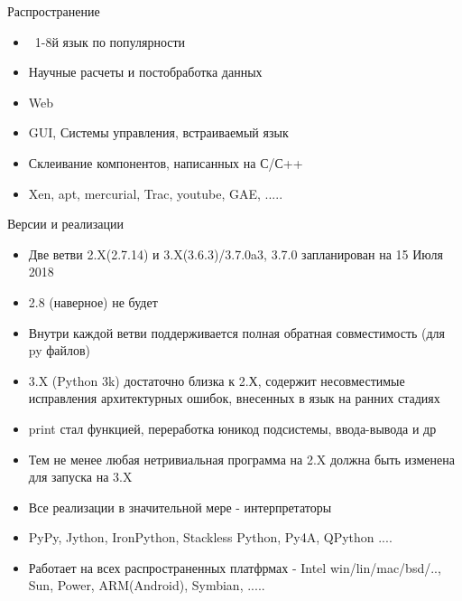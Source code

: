 \documentclass{article}
\begin{document}
\begin{center} Распространение \end{center}
\begin{itemize}
    \item ~1-8й язык по популярности
    \item Научные расчеты и постобработка данных
    \item Web
    \item GUI, Системы управления, встраиваемый язык
    \item Склеивание компонентов, написанных на С/С++
    \item Xen, apt, mercurial, Trac, youtube, GAE, .....
\end{itemize}
\newpage

\begin{center} Версии и реализации \end{center}
\begin{itemize}
    \item Две ветви 2.X(2.7.14) и 3.X(3.6.3)/3.7.0a3, 3.7.0 запланирован на 15 Июля 2018
    \item 2.8 (наверное) не будет
    \item Внутри каждой ветви поддерживается полная обратная совместимость (для py файлов)
    \item 3.X (Python 3k) достаточно близка к 2.Х, содержит несовместимые исправления 
    		архитектурных ошибок, внесенных в язык на ранних стадиях
    \item print стал функцией, переработка юникод подсистемы, ввода-вывода и др
    \item Тем не менее любая нетривиальная программа на 2.X должна быть изменена для запуска на 3.X
    \item Все реализации в значительной мере - интерпретаторы
    \item PyPy, Jython, IronPython, Stackless Python, Py4A, QPython  ....
    \item Работает на всех распространенных платфрмах - Intel win/lin/mac/bsd/.., Sun, Power, 
    		ARM(Android), Symbian, .....
\end{itemize}
\newpage
\end{document}
